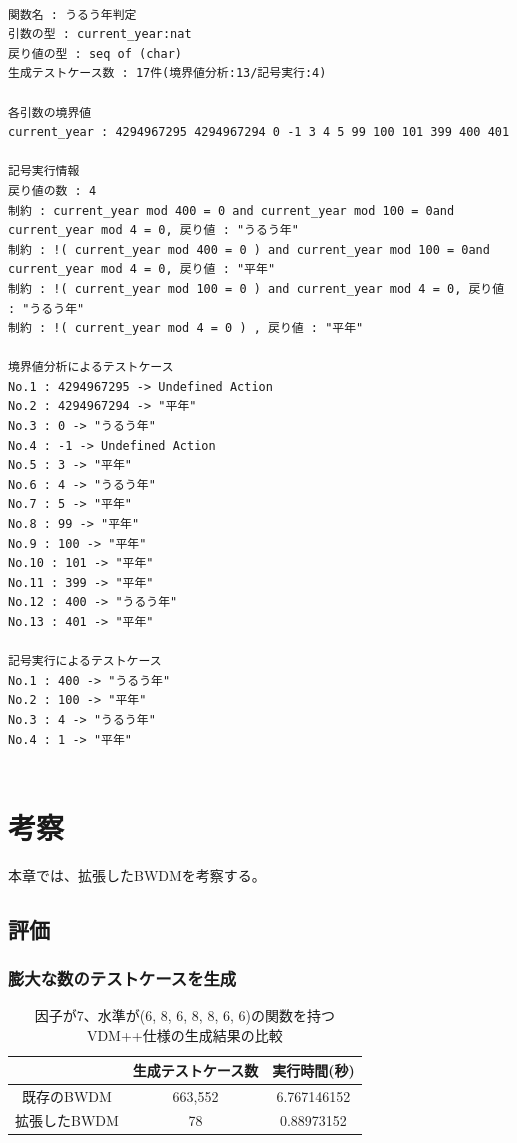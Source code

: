 \documentclass[uplatex, report, a4j, 10pt]{jsbook}
\begin{document}
\lstset{language=}
\noindent\begin{minipage}{\textwidth}
  \begin{lstlisting}[caption=拡張したBWDMに、操作定義を含む仕様(コード\ref{fig:multiple_definition})を適用した際の出力,label=fig:extended_multiple_definition]

関数名 : うるう年判定
引数の型 : current_year:nat 
戻り値の型 : seq of (char)
生成テストケース数 : 17件(境界値分析:13/記号実行:4)

各引数の境界値
current_year : 4294967295 4294967294 0 -1 3 4 5 99 100 101 399 400 401 

記号実行情報
戻り値の数 : 4
制約 : current_year mod 400 = 0 and current_year mod 100 = 0and current_year mod 4 = 0, 戻り値 : "うるう年"
制約 : !( current_year mod 400 = 0 ) and current_year mod 100 = 0and current_year mod 4 = 0, 戻り値 : "平年"
制約 : !( current_year mod 100 = 0 ) and current_year mod 4 = 0, 戻り値 : "うるう年"
制約 : !( current_year mod 4 = 0 ) , 戻り値 : "平年"

境界値分析によるテストケース
No.1 : 4294967295 -> Undefined Action
No.2 : 4294967294 -> "平年"
No.3 : 0 -> "うるう年"
No.4 : -1 -> Undefined Action
No.5 : 3 -> "平年"
No.6 : 4 -> "うるう年"
No.7 : 5 -> "平年"
No.8 : 99 -> "平年"
No.9 : 100 -> "平年"
No.10 : 101 -> "平年"
No.11 : 399 -> "平年"
No.12 : 400 -> "うるう年"
No.13 : 401 -> "平年"

記号実行によるテストケース
No.1 : 400 -> "うるう年"
No.2 : 100 -> "平年"
No.3 : 4 -> "うるう年"
No.4 : 1 -> "平年"
    
\end{lstlisting}
\end{minipage}

\chapter{考察}\label{cha:Evaluation}
本章では、拡張したBWDMを考察する。

\section{評価}
\subsection{膨大な数のテストケースを生成}

\begin{table}[tp]
  \begin{center}
    \caption{因子が7、水準が(6, 8, 6, 8, 8, 6, 6)の関数を持つVDM++仕様の生成結果の比較}
    \label{tab:pict4java_result}
    \begin{tabular}{c|c|c}
                   & 生成テストケース数 & 実行時間(秒) \\
      \hline
      \hline
      既存のBWDM   & 663,552            & 6.767146152  \\ \hline
      拡張したBWDM & 78                 & 0.88973152
    \end{tabular}
  \end{center}
\end{table}
\end{document}
